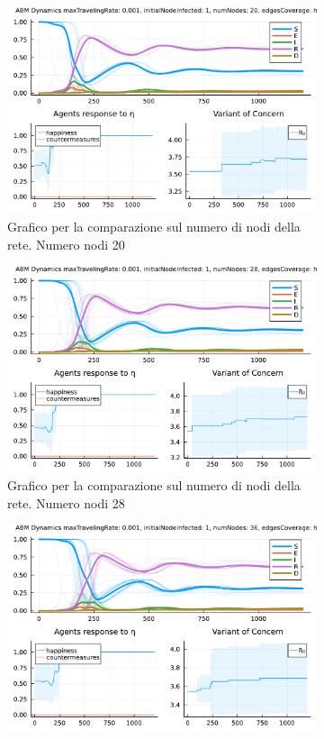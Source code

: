 \begin{figure}[!hb]
\begin{subfigure}[b]{0.45\textwidth}
		\includegraphics[width=\textwidth]{img/SocialNetworkABM_33.pdf}
		\caption{Grafico per la comparazione sul numero di nodi della rete. Numero nodi 20}
		\label{fig:comparison_numberOfNodes_20}
	\end{subfigure}
	\hfill
	\begin{subfigure}[b]{0.45\textwidth}
		\centering
		\includegraphics[width=\textwidth]{img/SocialNetworkABM_49.pdf}
		\caption{Grafico per la comparazione sul numero di nodi della rete. Numero nodi 28}
		\label{fig:comparison_numberOfNodes_28}
	\end{subfigure}
	\hfill
	\begin{subfigure}[b]{0.45\textwidth}
		\centering
		\includegraphics[width=\textwidth]{img/SocialNetworkABM_65.pdf}

\end{subfigure}
\end{figure}
